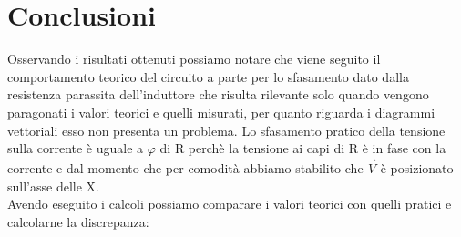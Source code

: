 \documentclass[12pt]{article}
\begin{document}
\section{Conclusioni}
Osservando i risultati ottenuti possiamo notare che viene seguito il comportamento teorico del circuito a parte per lo sfasamento dato
dalla resistenza parassita dell'induttore che risulta rilevante solo quando vengono paragonati i valori teorici e quelli misurati, per quanto riguarda i 
diagrammi vettoriali esso non presenta un problema. 
Lo sfasamento pratico della tensione sulla corrente è uguale a $\varphi$ di R perchè la tensione ai capi di R è in fase con la corrente
e dal momento che per comodità abbiamo stabilito che $\vec{V}$ è posizionato sull'asse delle X.\\
Avendo eseguito i calcoli possiamo comparare i valori teorici con quelli pratici e calcolarne la discrepanza:\\
\end{document}
